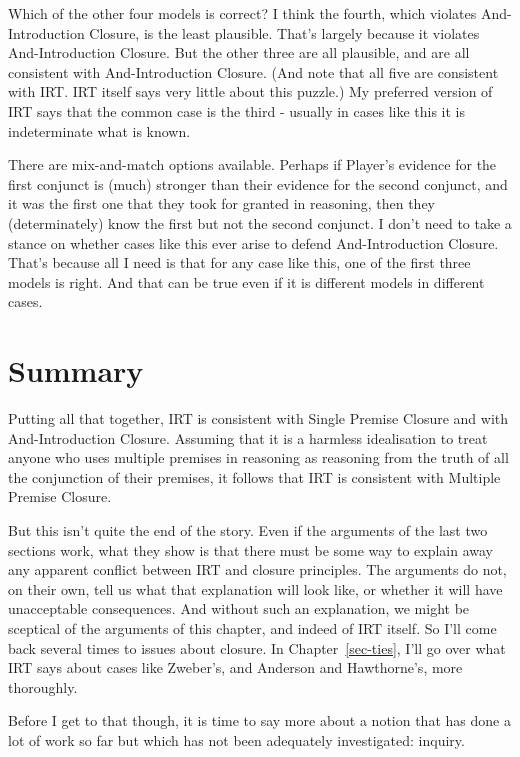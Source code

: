 \documentclass[
  12pt,
  letterpaper,
]{scrbook}
\begin{document}
Which of the other four models is correct? I think the fourth, which
violates And-Introduction Closure, is the least plausible. That's
largely because it violates And-Introduction Closure. But the other
three are all plausible, and are all consistent with And-Introduction
Closure. (And note that all five are consistent with IRT. IRT itself
says very little about this puzzle.) My preferred version of IRT says
that the common case is the third - usually in cases like this it is
indeterminate what is known.

There are mix-and-match options available. Perhaps if Player's evidence
for the first conjunct is (much) stronger than their evidence for the
second conjunct, and it was the first one that they took for granted in
reasoning, then they (determinately) know the first but not the second
conjunct. I don't need to take a stance on whether cases like this ever
arise to defend And-Introduction Closure. That's because all I need is
that for any case like this, one of the first three models is right. And
that can be true even if it is different models in different cases.

\section{Summary}\label{sec-closuresummary}

Putting all that together, IRT is consistent with Single Premise Closure
and with And-Introduction Closure. Assuming that it is a harmless
idealisation to treat anyone who uses multiple premises in reasoning as
reasoning from the truth of all the conjunction of their premises, it
follows that IRT is consistent with Multiple Premise Closure.

But this isn't quite the end of the story. Even if the arguments of the
last two sections work, what they show is that there must be some way to
explain away any apparent conflict between IRT and closure principles.
The arguments do not, on their own, tell us what that explanation will
look like, or whether it will have unacceptable consequences. And
without such an explanation, we might be sceptical of the arguments of
this chapter, and indeed of IRT itself. So I'll come back several times
to issues about closure. In Chapter~\ref{sec-ties}, I'll go over what
IRT says about cases like Zweber's, and Anderson and Hawthorne's, more
thoroughly.

Before I get to that though, it is time to say more about a notion that
has done a lot of work so far but which has not been adequately
investigated: inquiry.
\end{document}
